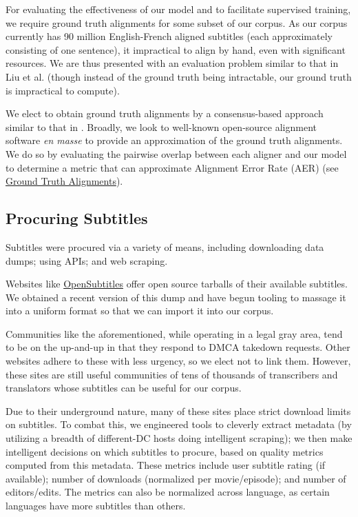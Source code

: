 \documentclass[twoside,twocolumn]{article}
\begin{document}
For evaluating the effectiveness of our model and to facilitate
supervised training, we require ground truth alignments for some subset of our corpus. As our corpus currently has 90 million English-French aligned subtitles
(each approximately consisting of one sentence), it impractical to align by hand,
even with significant resources.
We are thus presented with an evaluation problem similar to that in Liu et al.
\cite{liu2015streaming} (though instead of the ground truth being intractable,
our ground truth is impractical to compute).

We elect to obtain ground truth alignments by a consensus-based
approach similar to that in \cite{liu2015streaming}. Broadly, we look to
well-known open-source alignment software \textit{en masse} to provide an approximation of the ground truth alignments.
We do so by evaluating the pairwise overlap between
each aligner and our model to determine a metric that can approximate
Alignment Error Rate (AER) (see
\hyperref[subsec:ground-truth-alignments]{Ground Truth Alignments}).

\subsection{Procuring Subtitles}
\label{subsec:procuring-subtitles}

Subtitles were procured via a variety of means, including downloading data
dumps; using APIs; and web scraping.

Websites like \href{https://www.opensubtitles.org/}{OpenSubtitles} offer
open source tarballs of their available subtitles. We obtained
a recent version of this dump and have begun tooling to massage it into a
uniform format so that we can import it into our corpus.

Communities like the aforementioned, while operating in a legal gray area, tend
to be on the up-and-up in that they respond to DMCA takedown requests. Other
websites adhere to these with less urgency, so we elect not to link them.
However, these sites are still useful communities of tens of thousands of
transcribers and translators whose subtitles can be useful for our corpus.

Due to their underground nature, many of these sites place strict download
limits on subtitles. To combat this, we engineered tools to cleverly extract metadata (by utilizing a breadth of different-DC hosts doing intelligent
scraping); we then make intelligent decisions on which subtitles to procure,
based on quality metrics computed from this metadata. These metrics include user subtitle rating (if available); number of downloads (normalized per
movie/episode); and number of editors/edits. The metrics can also be normalized across language, as certain languages have more subtitles than others.
\end{document}

